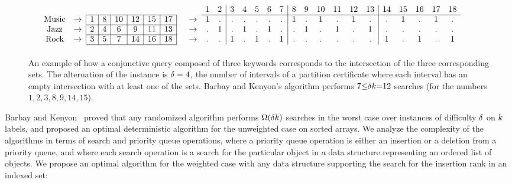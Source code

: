 \begin{figure}
  \centering
$$  \begin{array}[b]{cc|c|c|c|c|c|c|cccc|ccccc|cccccc|cccccccc}

    & 
    \multicolumn{7}{}  											                         &                    & & &
 1  &  2 &  3 &  4 &  5 &  6 &  7 & 8  &  9 &  10 &  11 & 12 &  13 &  14 & 15 & 16  & 17 & 18  &      &    
\\ \cline{3-8} \cline{11-28}


    \mbox{Music} & \rightarrow      
& 1                                & 8       & 10      & 12           & 15      & 17                 & & \rightarrow &
  1  &  . &  . &  . &  . &  . &  . & 1  &  . &  1 &  . &  1 &  . &  . &  1 &  . &  1 &  .  &   &    
\\ \cline{3-8}
    \mbox{Jazz} & \rightarrow
    & 2       & 4       & 6            & 9       & 11      & 13                                      & & \rightarrow &
  . & 1  &  . & 1  &  . & 1  &  . &  . & 1  &  . &  1 &  . &  1 &  . &  . &  . &  . &  . &     &    
\\ \cline{3-8}
    \mbox{Rock} & \rightarrow      
         & 3       & 5       & 7                                & 14      & 16      & 18             & & \rightarrow &
  . &  . & 1  &  . & 1  & .  & 1  &  . &  . &  . &  . &  . &  . &  1 &  . &  1 &  . &  1 &    
\\ \cline{3-8}
  \end{array}$$
  \begin{minipage}{.9\linewidth}
    \caption{ An example of how a conjunctive query composed 
      of three keywords corresponds to the
      intersection of the three corresponding sets.  
      The alternation of the instance is $\difficulty=4$, 
      the number of intervals of a partition certificate 
      where each interval has an empty intersection with at least one of the sets.
      Barbay and Kenyon's algorithm performs
      $7{\leq}\difficulty\nbkeywords{=}12$ searches (for the numbers
      $1,2,3,8,9,14,15$).  \label{fig:sequentialExample} }
  \end{minipage}
\end{figure}

Barbay and Kenyon~\cite{adaptiveIntersectionAndTThresholdProblems}
proved that any randomized algorithm performs
$\Omega(\delta k)$ searches in the worst case over
instances of difficulty $\delta$ on $k$ labels, and
proposed an optimal deterministic algorithm for the unweighted case on
sorted arrays.
%
We analyze the complexity of the algorithms in terms of search and
priority queue operations, where a priority queue operation is either an insertion or a
deletion from a priority queue, and where each search operation is a search for
the particular object in a data structure representing an ordered list
of objects.
%
We propose an optimal algorithm for the weighted case with any data
structure supporting the search for the insertion rank in an indexed
set:

